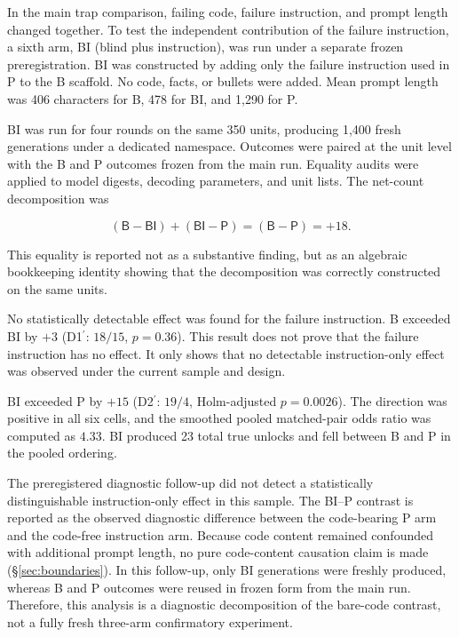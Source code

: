 \documentclass{article}
\numberwithin{equation}{section}  %
\theoremstyle{definition}
\newcommand{\armP}{\textsf{P}}
\newcommand{\armB}{\textsf{B}}
\newcommand{\armBI}{\textsf{BI}}
\begin{document}
In the main trap comparison, failing code, failure instruction, and prompt length changed
together. To test the independent contribution of the failure instruction, a sixth arm,
\armBI{} (blind plus instruction), was run under a separate frozen preregistration.
\armBI{} was constructed by adding only the failure instruction used in \armP{} to the
\armB{} scaffold. No code, facts, or bullets were added. Mean prompt length was 406
characters for \armB{}, 478 for \armBI{}, and 1{,}290 for \armP{}.

\armBI{} was run for four rounds on the same 350 units, producing 1{,}400 fresh generations
under a dedicated namespace. Outcomes were paired at the unit level with the \armB{} and
\armP{} outcomes frozen from the main run. Equality audits were applied to model digests,
decoding parameters, and unit lists. The net-count decomposition was

\[
(\armB-\armBI)+(\armBI-\armP)=(\armB-\armP)=+18 .
\]

This equality is reported not as a substantive finding, but as an algebraic bookkeeping
identity showing that the decomposition was correctly constructed on the same units.

No statistically detectable effect was found for the failure instruction. \armB{} exceeded
\armBI{} by $+3$ (D1$^{\prime}$: $18/15$, $p=0.36$). This result does not prove that the
failure instruction has no effect. It only shows that no detectable instruction-only effect
was observed under the current sample and design.

\armBI{} exceeded \armP{} by $+15$ (D2$^{\prime}$: $19/4$, Holm-adjusted $p=0.0026$). The
direction was positive in all six cells, and the smoothed pooled matched-pair odds ratio was
computed as $4.33$. \armBI{} produced 23 total true unlocks and fell between \armB{} and
\armP{} in the pooled ordering.

The preregistered diagnostic follow-up did not detect a statistically distinguishable
instruction-only effect in this sample. The \armBI{}--\armP{} contrast is reported as the
observed diagnostic difference between the code-bearing \armP{} arm and the code-free
instruction arm. Because code content remained confounded with additional prompt length, no
pure code-content causation claim is made (\S\ref{sec:boundaries}). In this follow-up, only
\armBI{} generations were freshly produced, whereas \armB{} and \armP{} outcomes were reused
in frozen form from the main run. Therefore, this analysis is a diagnostic decomposition of
the bare-code contrast, not a fully fresh three-arm confirmatory experiment.
\end{document}
